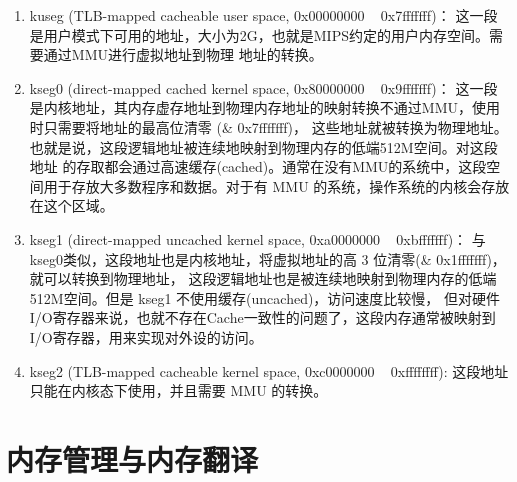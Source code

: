 \begin{enumerate}
  \item kuseg (TLB-mapped cacheable user space, 0x00000000 ~ 0x7fffffff)：
  这一段是用户模式下可用的地址，大小为2G，也就是MIPS约定的用户内存空间。需要通过MMU进行虚拟地址到物理
  地址的转换。
  \item kseg0 (direct-mapped cached kernel space, 0x80000000 ~ 0x9fffffff)：
  这一段是内核地址，其内存虚存地址到物理内存地址的映射转换不通过MMU，使用时只需要将地址的最高位清零
  (\& 0x7fffffff)，
  这些地址就被转换为物理地址。也就是说，这段逻辑地址被连续地映射到物理内存的低端512M空间。对这段地址
  的存取都会通过高速缓存(cached)。通常在没有MMU的系统中，这段空间用于存放大多数程序和数据。对于有
  MMU 的系统，操作系统的内核会存放在这个区域。
  \item kseg1 (direct-mapped uncached kernel space, 0xa0000000 ~ 0xbfffffff)：
  与kseg0类似，这段地址也是内核地址，将虚拟地址的高 3 位清零(\& 0x1fffffff)，就可以转换到物理地址，
  这段逻辑地址也是被连续地映射到物理内存的低端512M空间。但是 kseg1 不使用缓存(uncached)，访问速度比较慢，
  但对硬件I/O寄存器来说，也就不存在Cache一致性的问题了，这段内存通常被映射到I/O寄存器，用来实现对外设的访问。
  \item kseg2 (TLB-mapped cacheable kernel space, 0xc0000000 ~ 0xffffffff):
  这段地址只能在内核态下使用，并且需要 MMU 的转换。
\end{enumerate}

\section{内存管理与内存翻译}

